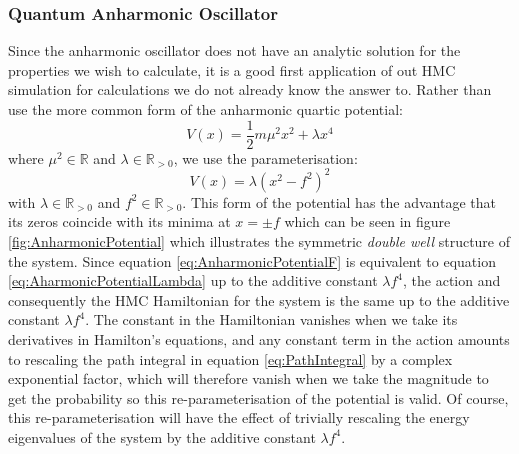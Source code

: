 \documentclass[12pt]{article}
\begin{document}
        \subsubsection{Quantum Anharmonic Oscillator}
            Since the anharmonic oscillator does not have an analytic solution for the properties we wish to calculate, it is a good first application of out HMC simulation for calculations we do not already know the answer to. Rather than use the more common form of the anharmonic quartic potential:
            \begin{equation}
                \label{eq:AharmonicPotentialLambda}
                V\left(x\right) = \frac{1}{2}m\mu^2x^2+\lambda x^4
            \end{equation}
            where $\mu^2 \in\mathbb{R}$ and $\lambda\in\mathbb{R}_{>0}$, we use the parameterisation:
            \begin{equation}
                \label{eq:AnharmonicPotentialF}
                V\left(x\right) = \lambda\left(x^2-f^2\right)^2
            \end{equation}
            with $\lambda\in\mathbb{R}_{>0}$ and $f^2\in\mathbb{R}_{>0}$. This form of the potential has the advantage that its zeros coincide with its minima at $x=\pm f$ which can be seen in figure \ref{fig:AnharmonicPotential} which illustrates the symmetric \textit{double well} structure of the system. Since equation \ref{eq:AnharmonicPotentialF} is equivalent to equation \ref{eq:AharmonicPotentialLambda} up to the additive constant $\lambda f^4$, the action and consequently the HMC Hamiltonian for the system is the same up to the additive constant $\lambda f^4$. The constant in the Hamiltonian vanishes when we take its derivatives in Hamilton's equations, and any constant term in the action amounts to rescaling the path integral in equation \ref{eq:PathIntegral} by a complex exponential factor, which will therefore vanish when we take the magnitude to get the probability so this re-parameterisation of the potential is valid. Of course, this re-parameterisation will have the effect of trivially rescaling the energy eigenvalues of the system by the additive constant $\lambda f^4$. 
\end{document}
